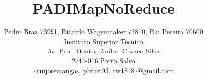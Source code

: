 \documentclass[times, 10pt,twocolumn]{article}
\begin{document}
\title{PADIMapNoReduce}

\author{Pedro Braz 73991, Ricardo Wagenmaker 73810, Rui Pereira 70600\\
Instituto Superior Técnico\\ Av. Prof. Doutor Aníbal Cavaco Silva\\2744-016 Porto Salvo\\
\{ruijosemangas, pbraz.93, rw1818\}@gmail.com
}

\maketitle
\thispagestyle{empty}








\nocite{ex1}


\end{document}

